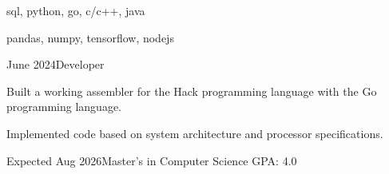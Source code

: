 \documentclass{resume}
\begin{document}
\begin{Section}[Skills]
\begin{Skill}[Languages]{sql, python, go, c/c++, java}
\end{Skill}
\begin{Skill}{pandas, numpy, tensorflow, nodejs}
\end{Skill}
\end{Section}

\begin{Section}[Projects]
\begin{Experience}[Go Assembler]{June 2024}{Developer}{}
\item Built a working assembler for the Hack programming language with the Go programming language.
\item Implemented code based on system architecture and processor specifications.
\end{Experience}
\end{Section}

\begin{Section}[Education]
\begin{Education}{Expected Aug 2026}{Master's in Computer Science}
GPA: 4.0
\end{Education}
\end{Section}
\end{document}
